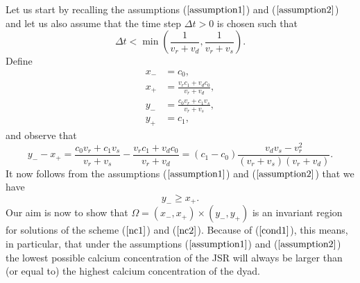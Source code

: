 Let us start by recalling the assumptions ($\ref{assumption1}$) and ($\ref{assumption2}$) and let us also assume that the time step $\Delta t>0$ is chosen such that%
\begin{equation}
\Delta t<\min\left(  \frac{1}{v_{r}+v_{d}},\frac{1}{v_{r}+v_{s}}\right).
\label{dt}%
\end{equation}
Define 
\begin{align}
x_{-}  &  =c_{0},\text{ } \label{xm}\\
x_{+}  &  =\frac{v_{r}c_{1}+v_{d}c_{0}}{v_{r}+v_{d}}, \label{xp}\\
y_{-}  &  =\frac{c_{0}v_{r}+c_{1}v_{s}}{v_{r}+v_{s}}, \label{ym}\\
y_{+}  &  =c_{1}, \label{yp}
\end{align}
and observe that%
\[
y_{-}-x_{+}=\frac{c_{0}v_{r}+c_{1}v_{s}}{v_{r}+v_{s}}-\frac{v_{r}c_{1}%
+v_{d}c_{0}}{v_{r}+v_{d}}=\left(  c_{1}-c_{0}\right)  \frac{v_{d}v_{s}%
-v_{r}^{2}}{\left(  v_{r}+v_{s}\right)  \left(  v_{r}+v_{d}\right)  }.
\]
It now follows from the assumptions  ($\ref{assumption1}$) and ($\ref{assumption2}$)  that we have%
\begin{equation}
y_{-}\geqslant x_{+}. \label{cond1}%
\end{equation}
Our aim is now to show that $\Omega=(x_{-},x_{+})\times(y_{-},y_{+})$ is an invariant region for solutions of the scheme ($\ref{nc1}$) and ($\ref{nc2}$).
Because of ($\ref{cond1}$), this means, in particular, that under the assumptions ($\ref{assumption1}$) and ($\ref{assumption2}$) the lowest possible 
calcium concentration of the JSR will always be larger than (or equal to) the
highest calcium concentration of the dyad.

